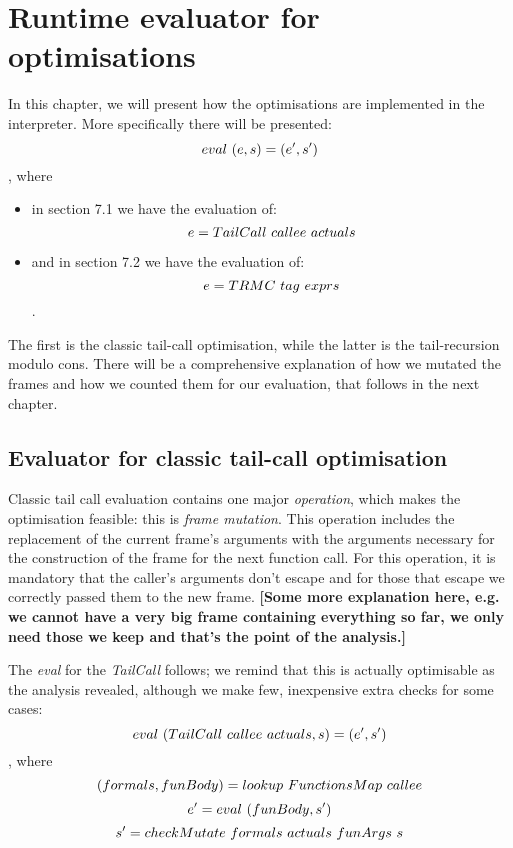 \documentclass[diploma]{softlab-thesis}
\begin{document}

\chapter {Runtime evaluator for optimisations}
In this chapter, we will present how the optimisations are implemented in the interpreter.
More specifically there will be presented:
\[eval \hfill\ (e, s) = (e', s') \],
where
\begin{itemize}
\item in section 7.1 we have the evaluation of:
\[e = TailCall \hfill\ callee \hfill\ actuals \] 
\item and in section 7.2 we have the evaluation of:
\[e = TRMC \hfill\ tag \hfill\ exprs \].
\end{itemize}
The first is the classic tail-call optimisation, while the latter is the tail-recursion 
modulo cons. There will be a comprehensive explanation of how we mutated the frames and how we counted them for 
our evaluation, that follows in the next chapter.

\section {Evaluator for classic tail-call optimisation}

Classic tail call evaluation contains one major \textit{operation}, which makes the optimisation 
feasible: this is \textit{frame mutation}. This operation includes the replacement of the current frame's arguments 
with the arguments necessary for the construction of the frame for the next function call. For this operation,
it is mandatory that the caller's arguments don't escape and for those that escape we correctly passed them 
to the new frame.
\textbf{[Some more explanation here, e.g. we cannot have a very big frame containing everything so far, 
we only need those we keep and that's the point of the analysis.]}

The \textit{eval} for the \textit{TailCall} follows; we remind that this is actually optimisable as the analysis 
revealed, although we make few, inexpensive extra checks for some cases:
\[eval \hfill\ (TailCall \hfill\ callee \hfill\ actuals, s) = (e', s')\], where
\[(formals, funBody) = lookup \hfill\ FunctionsMap \hfill\ callee \]
\[e' = eval \hfill\ (funBody, s') \]
\[s' = checkMutate \hfill\ formals \hfill\ actuals \hfill\ funArgs \hfill\ s \]
\end{document}
